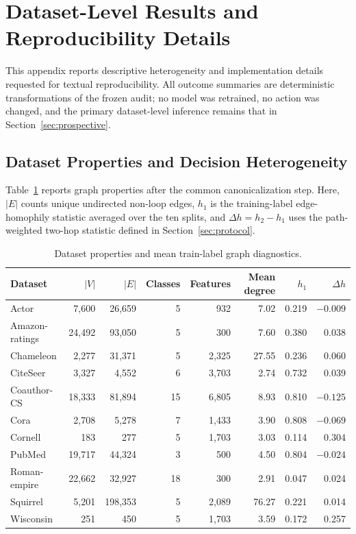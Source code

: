 \section{Dataset-Level Results and Reproducibility Details}
\label{app:reproducibility}

This appendix reports descriptive heterogeneity and implementation details requested for textual reproducibility. All outcome summaries are deterministic transformations of the frozen audit; no model was retrained, no action was changed, and the primary dataset-level inference remains that in Section~\ref{sec:prospective}.

\subsection{Dataset Properties and Decision Heterogeneity}

Table~\ref{tab:dataset_properties} reports graph properties after the common canonicalization step. Here, $|E|$ counts unique undirected non-loop edges, $h_1$ is the training-label edge-homophily statistic averaged over the ten splits, and $\Delta h=h_2-h_1$ uses the path-weighted two-hop statistic defined in Section~\ref{sec:protocol}.

\begin{table}[ht]
\centering
\caption{Dataset properties and mean train-label graph diagnostics.}
\label{tab:dataset_properties}
\scriptsize
\setlength{\tabcolsep}{3.2pt}
\begin{tabular}{@{}lrrrrrrr@{}}
\toprule
Dataset & $|V|$ & $|E|$ & Classes & Features & Mean degree & $h_1$ & $\Delta h$ \\
\midrule
Actor & 7,600 & 26,659 & 5 & 932 & 7.02 & 0.219 & $-0.009$ \\
Amazon-ratings & 24,492 & 93,050 & 5 & 300 & 7.60 & 0.380 & 0.038 \\
Chameleon & 2,277 & 31,371 & 5 & 2,325 & 27.55 & 0.236 & 0.060 \\
CiteSeer & 3,327 & 4,552 & 6 & 3,703 & 2.74 & 0.732 & 0.039 \\
Coauthor-CS & 18,333 & 81,894 & 15 & 6,805 & 8.93 & 0.810 & $-0.125$ \\
Cora & 2,708 & 5,278 & 7 & 1,433 & 3.90 & 0.808 & $-0.069$ \\
Cornell & 183 & 277 & 5 & 1,703 & 3.03 & 0.114 & 0.304 \\
PubMed & 19,717 & 44,324 & 3 & 500 & 4.50 & 0.804 & $-0.024$ \\
Roman-empire & 22,662 & 32,927 & 18 & 300 & 2.91 & 0.047 & 0.024 \\
Squirrel & 5,201 & 198,353 & 5 & 2,089 & 76.27 & 0.221 & 0.014 \\
Wisconsin & 251 & 450 & 5 & 1,703 & 3.59 & 0.172 & 0.257 \\
\bottomrule
\end{tabular}
\end{table}


